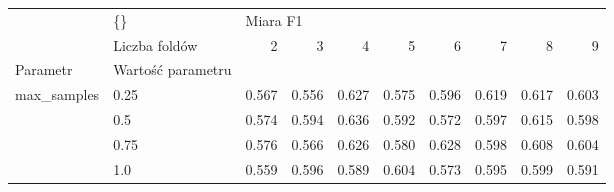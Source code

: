 \begin{tabular}{llrrrrrrrr}
\hline
            & \{\} & \multicolumn{8}{l}{Miara F1} \\
            & Liczba foldów &        2 &      3 &      4 &      5 &      6 &      7 &      8 &      9 \\
Parametr & Wartość parametru &          &        &        &        &        &        &        &        \\
\hline
max\_samples & 0.25 &    0.567 &  0.556 &  0.627 &  0.575 &  0.596 &  0.619 &  0.617 &  0.603 \\
            & 0.5 &    0.574 &  0.594 &  0.636 &  0.592 &  0.572 &  0.597 &  0.615 &  0.598 \\
            & 0.75 &    0.576 &  0.566 &  0.626 &  0.580 &  0.628 &  0.598 &  0.608 &  0.604 \\
            & 1.0 &    0.559 &  0.596 &  0.589 &  0.604 &  0.573 &  0.595 &  0.599 &  0.591 \\
\hline
\end{tabular}

